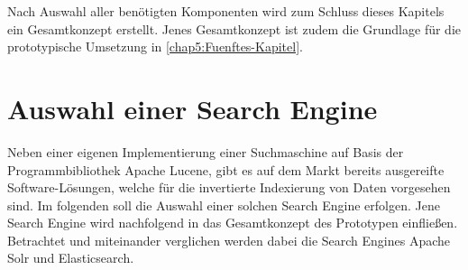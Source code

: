 Nach Auswahl aller benötigten Komponenten wird zum Schluss dieses Kapitels ein Gesamtkonzept erstellt. Jenes Gesamtkonzept ist zudem die Grundlage für die prototypische Umsetzung in \autoref{chap5:Fuenftes-Kapitel}.









\section{Auswahl einer Search Engine\label{sec4.1:Unterpunkt-1}}

Neben einer eigenen Implementierung einer Suchmaschine auf Basis der Programmbibliothek \glqq Apache Lucene\grqq{}, gibt es auf dem Markt bereits ausgereifte Software-Lösungen, welche für die invertierte Indexierung von Daten vorgesehen sind. Im folgenden soll die Auswahl einer solchen Search Engine erfolgen. Jene Search Engine wird nachfolgend in das Gesamtkonzept des Prototypen einfließen. Betrachtet und miteinander verglichen werden dabei die Search Engines \glqq Apache Solr\grqq{} und \glqq Elasticsearch\grqq{}.

